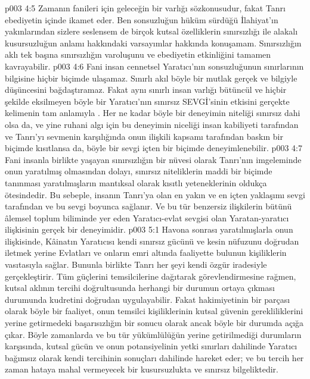 \vs p003 4:5 Zamanın fanileri için geleceğin bir varlığı sözkonusudur, fakat Tanrı ebediyetin içinde ikamet eder. Ben sonsuzluğun hüküm sürdüğü İlahiyat’ın yakınlarından sizlere seslensem de birçok kutsal özelliklerin sınırsızlığı ile alakalı kusursuzluğun anlamı hakkındaki varsayımlar hakkında konuşamam. Sınırsızlığın aklı tek başına sınırsızlığın varoluşunu ve ebediyetin etkinliğini tamamen kavrayabilir.
\vs p003 4:6 Fani insan cennetsel Yaratıcı’nın sonsuzluğunun sınırlarının bilgisine hiçbir biçimde ulaşamaz. Sınırlı akıl böyle bir mutlak gerçek ve bilgiyle düşüncesini bağdaştıramaz. Fakat aynı sınırlı insan varlığı bütüncül ve hiçbir şekilde eksilmeyen böyle bir Yaratıcı’nın sınırsız SEVGİ’sinin etkisini gerçekte kelimenin tam anlamıyla . Her ne kadar böyle bir deneyimin niteliği sınırsız dahi olsa da, ve yine ruhani algı için bu deneyimin niceliği insan kabiliyeti tarafından ve Tanrı’yı sevmenin karşılığında onun ilişkili kapsamı tarafından baskın bir biçimde kısıtlansa da, böyle bir sevgi içten bir biçimde deneyimlenebilir.
\vs p003 4:7 Fani insanla birlikte yaşayan sınırsızlığın bir nüvesi olarak Tanrı’nın imgeleminde onun yaratılmış olmasından dolayı, sınırsız niteliklerin maddi bir biçimde tanınması yaratılmışların mantıksal olarak kısıtlı yeteneklerinin oldukça ötesindedir. Bu sebeple, insanın Tanrı’ya olan en yakın ve en içten yaklaşımı sevgi tarafından ve bu sevgi boyunca sağlanır. Ve bu tür benzersiz ilişkilerin bütünü âlemsel toplum biliminde yer eden Yaratıcı\hyp{}evlat sevgisi olan Yaratan\hyp{}yaratıcı ilişkisinin gerçek bir deneyimidir.
\vs p003 5:1 Havona sonrası yaratılmışlarla onun ilişkisinde, Kâinatın Yaratıcısı kendi sınırsız gücünü ve kesin nüfuzunu doğrudan iletmek yerine Evlatları ve onların emri altında faaliyette bulunun kişiliklerin vasıtasıyla sağlar. Bununla birlikte Tanrı her şeyi kendi özgür iradesiyle gerçekleştirir. Tüm güçlerini temsilcilerine dağıtarak görevlendirmesine rağmen, kutsal aklının tercihi doğrultusunda herhangi bir durumun ortaya çıkması durumunda kudretini doğrudan uygulayabilir. Fakat hakimiyetinin bir parçası olarak böyle bir faaliyet, onun temsilci kişiliklerinin kutsal güvenin gerekliliklerini yerine getirmedeki başarısızlığın bir sonucu olarak ancak böyle bir durumda açığa çıkar. Böyle zamanlarda ve bu tür yükümlülüğün yerine getirilmediği durumların karşısında, kutsal gücün ve onun potansiyelinin yetki sınırları dahilinde Yaratıcı bağımsız olarak kendi tercihinin sonuçları dahilinde hareket eder; ve bu tercih her zaman hataya mahal vermeyecek bir kusursuzlukta ve sınırsız bilgeliktedir.

